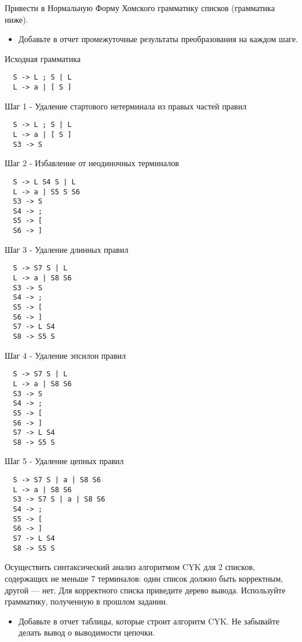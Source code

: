 
\graphicspath{{../1/}{../2/}}


\begin{problem}
  Привести в Нормальную Форму Хомского грамматику списков (грамматика ниже).
\end{problem}

\begin{itemize}  
  \item Добавьте в отчет промежуточные результаты преобразования на каждом шаге.
\end{itemize}

Исходная грамматика
\begin{lstlisting}
  S -> L ; S | L
  L -> a | [ S ]
\end{lstlisting}

Шаг 1 - Удаление стартового нетерминала из правых частей правил
\begin{lstlisting}
  S -> L ; S | L
  L -> a | [ S ]
  S3 -> S
\end{lstlisting}

Шаг 2 - Избавление от неодиночных терминалов
\begin{lstlisting}
  S -> L S4 S | L
  L -> a | S5 S S6
  S3 -> S
  S4 -> ;
  S5 -> [
  S6 -> ]
\end{lstlisting}

Шаг 3 - Удаление длинных правил
\begin{lstlisting}
  S -> S7 S | L
  L -> a | S8 S6
  S3 -> S
  S4 -> ;
  S5 -> [
  S6 -> ]
  S7 -> L S4
  S8 -> S5 S
\end{lstlisting}

Шаг 4 - Удаление эпсилон правил
\begin{lstlisting}
  S -> S7 S | L
  L -> a | S8 S6
  S3 -> S
  S4 -> ;
  S5 -> [
  S6 -> ]
  S7 -> L S4
  S8 -> S5 S
\end{lstlisting}

Шаг 5 - Удаление цепных правил
\begin{lstlisting}
  S -> S7 S | a | S8 S6
  L -> a | S8 S6
  S3 -> S7 S | a | S8 S6
  S4 -> ;
  S5 -> [
  S6 -> ]
  S7 -> L S4
  S8 -> S5 S
\end{lstlisting}


\begin{problem}
  Осуществить синтаксический анализ алгоритмом CYK для 2 списков, содержащих не меньше 7 терминалов: один список должно быть корректным, другой — нет. Для корректного 
  списка приведите дерево вывода. Используйте грамматику, полученную в прошлом задании.
\end{problem}
\begin{itemize}  
  \item Добавьте в отчет таблицы, которые строит алгоритм CYK. Не забывайте делать вывод
  о выводимости цепочки.
\end{itemize}

